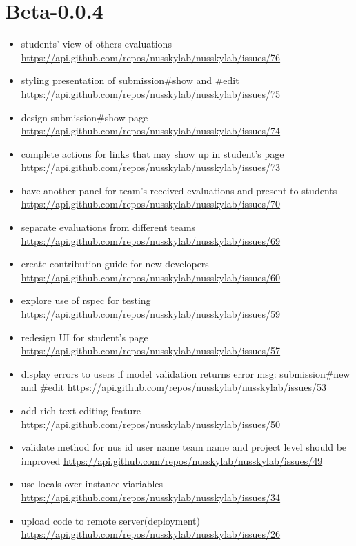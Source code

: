 {\section{Beta-0.0.4}
\begin{itemize}[noitemsep]
    \item students' view of others evaluations \url{https://api.github.com/repos/nusskylab/nusskylab/issues/76} 
    \item styling presentation of submission\#show and \#edit \url{https://api.github.com/repos/nusskylab/nusskylab/issues/75} 
    \item design submission\#show page \url{https://api.github.com/repos/nusskylab/nusskylab/issues/74} 
    \item complete actions for links that may show up in student's page \url{https://api.github.com/repos/nusskylab/nusskylab/issues/73} 
    \item have another panel for team's received evaluations and present to students \url{https://api.github.com/repos/nusskylab/nusskylab/issues/70} 
    \item separate evaluations from different teams \url{https://api.github.com/repos/nusskylab/nusskylab/issues/69} 
    \item create contribution guide for new developers \url{https://api.github.com/repos/nusskylab/nusskylab/issues/60} 
    \item explore use of rspec for testing \url{https://api.github.com/repos/nusskylab/nusskylab/issues/59} 
    \item redesign UI for student's page \url{https://api.github.com/repos/nusskylab/nusskylab/issues/57} 
    \item display errors to users if model validation returns error msg: submission\#new and \#edit \url{https://api.github.com/repos/nusskylab/nusskylab/issues/53} 
    \item add rich text editing feature \url{https://api.github.com/repos/nusskylab/nusskylab/issues/50} 
    \item validate method for nus id  user name  team name and project level should be improved \url{https://api.github.com/repos/nusskylab/nusskylab/issues/49} 
    \item use locals over instance viariables \url{https://api.github.com/repos/nusskylab/nusskylab/issues/34} 
    \item upload code to remote server(deployment) \url{https://api.github.com/repos/nusskylab/nusskylab/issues/26} 
\end{itemize}

}
